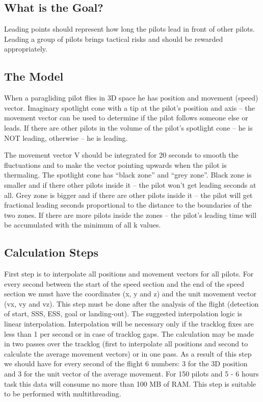 \documentclass[gap.tex]{subfiles}
\begin{document}
\label{sec:real-leading}

\subsection{What is the Goal?}
Leading points should represent how long the pilots lead in front of other
pilots. Leading a group of pilots brings tactical risks and should be rewarded
appropriately.

\subsection{The Model}
When a paragliding pilot flies in 3D space he has
position and movement (speed) vector. Imaginary spotlight cone with a tip at
the pilot’s position and axis – the movement vector can be used to determine if
the pilot follows someone else or leads. If there are other pilots in the
volume of the pilot’s spotlight cone – he is NOT leading, otherwise – he is
leading.

The movement vector V should be integrated for 20 seconds to smooth
the fluctuations and to make the vector pointing upwards when the pilot is
thermaling. The spotlight cone has “black zone” and “grey zone”. Black zone is
smaller and if there other pilots inside it – the pilot won’t get leading
seconds at all. Grey zone is bigger and if there are other pilots inside it
– the pilot will get fractional leading seconds proportional to the distance to
the boundaries of the two zones. If there are more pilots inside the zones
– the pilot’s leading time will be accumulated with the minimum of all
k values.

\subsection{Calculation Steps}
First step is to interpolate all positions and movement vectors for all pilots.
For every second between the start of the speed section and the end of the
speed section we must have the coordinates (x, y and z) and the unit movement
vector (vx, vy and vz). This step must be done after the analysis of the flight
(detection of start, SSS, ESS, goal or landing-out). The suggested
interpolation logic is linear interpolation. Interpolation will be necessary
only if the tracklog fixes are less than 1 per second or in case of tracklog
gaps. The calculation may be made in two passes over the tracklog (first to
interpolate all positions and second to calculate the average movement vectors)
or in one pass. As a result of this step we should have for every second of the
flight 6 numbers: 3 for the 3D position and 3 for the unit vector of the
average movement. For 150 pilots and 5 - 6 hours task this data will consume no
more than 100 MB of RAM. This step is suitable to be performed with
multithreading.
\end{document}
